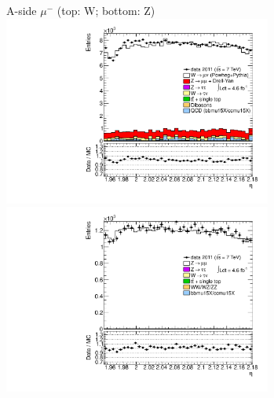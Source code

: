 {{
A-side $\mu^{-}$ (top: W; bottom: Z)
\centering
\includegraphics[width=0.66\textwidth]{dates/20130306/figures/etaphi/W_10_A_stack_l_eta_NEG} \\
\includegraphics[width=0.66\textwidth]{dates/20130306/figures/etaphi/Ztprobet_10_A_stack_lN_eta_ALL.pdf} 

\cole
}



 {
\colb[T]

}}
